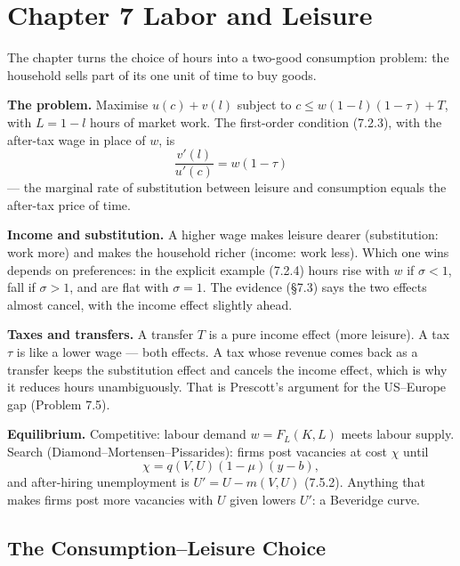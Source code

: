 \documentclass[12pt, letterpaper]{article}
\begin{document}
\tableofcontents
\newpage

\section{Chapter 7 \quad Labor and Leisure}

\begin{tcolorbox}[theorybox,title={Chapter 7 Overview}]
The chapter turns the choice of hours into a two-good consumption problem: the household
sells part of its one unit of time to buy goods.

\smallskip
\textbf{The problem.} Maximise $u(c)+v(l)$ subject to $c\le w(1-l)(1-\tau)+T$, with
$L=1-l$ hours of market work. The first-order condition (7.2.3), with the after-tax wage in
place of $w$, is
\[
\frac{v'(l)}{u'(c)}=w(1-\tau)
\]
--- the marginal rate of substitution between leisure and consumption equals the after-tax
price of time.

\smallskip
\textbf{Income and substitution.} A higher wage makes leisure dearer (substitution: work
more) and makes the household richer (income: work less). Which one wins depends on
preferences: in the explicit example (7.2.4) hours rise with $w$ if $\sigma<1$, fall if
$\sigma>1$, and are flat with $\sigma=1$. The evidence (\S7.3) says the two effects almost
cancel, with the income effect slightly ahead.

\smallskip
\textbf{Taxes and transfers.} A transfer $T$ is a pure income effect (more leisure). A tax
$\tau$ is like a lower wage --- both effects. A tax whose revenue comes back as a transfer
keeps the substitution effect and cancels the income effect, which is why it reduces hours
unambiguously. That is Prescott's argument for the US--Europe gap (Problem 7.5).

\smallskip
\textbf{Equilibrium.} Competitive: labour demand $w=F_L(K,L)$ meets labour supply.
Search (Diamond--Mortensen--Pissarides): firms post vacancies at cost $\chi$ until
\[
\chi=q(V,U)(1-\mu)(y-b), \tag{7.5.1}
\]
and after-hiring unemployment is $U'=U-m(V,U)$ (7.5.2). Anything that makes firms post more
vacancies with $U$ given lowers $U'$: a Beveridge curve.
\end{tcolorbox}

\newpage
\subsection{The Consumption--Leisure Choice}
\end{document}
